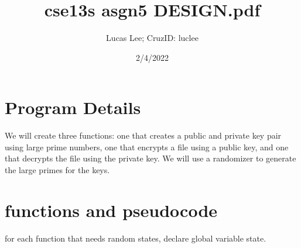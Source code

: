 \documentclass[11pt]{article}
\title{cse13s asgn5 DESIGN.pdf}
\author{Lucas Lee; CruzID: luclee}
\date{2/4/2022}
\begin{document}
\maketitle
\section{Program Details}\label{ss:details}
We will create three functions: one that creates a public and private key pair using large prime numbers, one that encrypts a file using a public key, and one that decrypts the file using the private key. We will use a randomizer to generate the large primes for the keys.

\section{functions and pseudocode}\label{ss:functions}
for each function that needs random states, declare global variable state.
\end{document}
